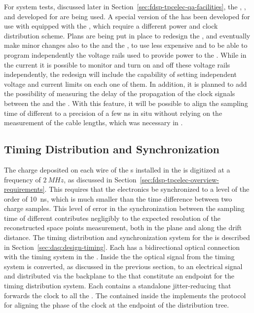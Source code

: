 For system tests, discussed later in Section~\ref{sec:fdsp-tpcelec-qa-facilities},
the , , and  developed for 
are being used. A special version of the  has been developed
for use with  equipped with the  ,
which require a different power and clock distribution scheme. Plans are
being put in place to redesign the , and eventually make 
minor changes also to the  and the , to use 
less expensive  and to be able to program independently
the voltage rails used to provide power to the . While in
the current  it is possible to monitor and turn on and off
these voltage rails independently, the redesign will include the
capability of setting independent voltage and current limits on each
one of them. In addition, it is planned to add the possibility of measuring
the delay of the propagation
of the clock signals between the  and the . With
this feature, it will be possible to align the sampling time of different
 to a precision of a few ns in situ without relying on the 
measurement of the cable lengths, which was necessary
in .


\subsection{Timing Distribution and Synchronization}
\label{sec:fdsp-tpcelec-design-timing}

The charge deposited on each wire of the s installed 
in the   is digitized at a frequency of
$\SI{2}{MHz}$, as discussed in 
Section~\ref{sec:fdsp-tpcelec-overview-requirements}. This requires
that the  electronics be synchronized to a level of the order of \SI{10}{ns}, which is
much smaller than the time difference between two charge samples.
This level of error in the synchronization between the sampling time of different
 contributes negligibly to the expected resolution %
of the reconstructed space points measurement,
both in the  plane and along the drift distance.
The timing distribution and synchronization system for the 
 is described in Section~\ref{sec:daq:design-timing}.
Each  has a bidirectional optical connection with the
timing system in the . Inside the  the optical
signal from the timing system is converted, as discussed in the previous
section, to an electrical signal and distributed via the backplane to
the  that constitute an endpoint for the timing distribution
system. Each  contains a standalone jitter-reducing  
that forwards the clock to all the . The
 contained inside the  implements the 
protocol~\cite{bib:docdb1651,bib:docdb11233} for aligning
the phase of the clock at the endpoint of the distribution tree.

